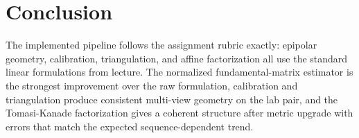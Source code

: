 {\section*{Conclusion}
The implemented pipeline follows the assignment rubric exactly: epipolar geometry, calibration, triangulation, and affine factorization all use the standard linear formulations from lecture. The normalized fundamental-matrix estimator is the strongest improvement over the raw formulation, calibration and triangulation produce consistent multi-view geometry on the lab pair, and the Tomasi-Kanade factorization gives a coherent structure after metric upgrade with errors that match the expected sequence-dependent trend.

}
